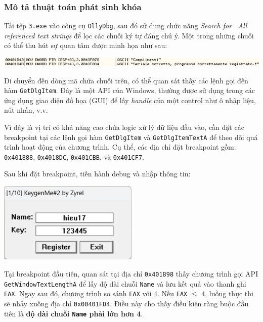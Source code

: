 \subsubsection{Mô tả thuật toán phát sinh khóa}

Tải tệp \texttt{3.exe} vào công cụ \texttt{OllyDbg}, sau đó sử dụng chức năng \textit{Search for \textrightarrow\ All referenced text strings} để lọc các chuỗi ký tự đáng chú ý. Một trong những chuỗi có thể thu hút sự quan tâm được minh họa như sau:

\begin{center}
    \includegraphics[width=\textwidth]{img/file-3/1.png}
\end{center}

Di chuyển đến dòng mã chứa chuỗi trên, có thể quan sát thấy các lệnh gọi đến hàm \texttt{GetDlgItem}. Đây là một API của Windows, thường được sử dụng trong các ứng dụng giao diện đồ họa (GUI) để lấy \textit{handle} của một control như ô nhập liệu, nút nhấn, v.v.

Vì đây là vị trí có khả năng cao chứa logic xử lý dữ liệu đầu vào, cần đặt các breakpoint tại các lệnh gọi hàm \texttt{GetDlgItem} và \texttt{GetDlgItemTextA} để theo dõi quá trình hoạt động của chương trình. Cụ thể, các địa chỉ đặt breakpoint gồm: \texttt{0x401888}, \texttt{0x4018DC}, \texttt{0x401CBB}, và \texttt{0x401CF7}.

\vspace{0.5em}
Sau khi đặt breakpoint, tiến hành debug và nhập thông tin:

\begin{center}
    \includegraphics[width=0.5\textwidth]{img/file-3/2.png}
\end{center}

Tại breakpoint đầu tiên, quan sát tại địa chỉ \texttt{0x401898} thấy chương trình gọi API \texttt{GetWindowTextLengthA} để lấy độ dài chuỗi \texttt{Name} và lưu kết quả vào thanh ghi \texttt{EAX}. Ngay sau đó, chương trình so sánh \texttt{EAX} với 4. Nếu \texttt{EAX} $\leq$ 4, luồng thực thi sẽ nhảy xuống địa chỉ \texttt{0x00401FD4}. Điều này cho thấy điều kiện ràng buộc đầu tiên là \textbf{độ dài chuỗi \texttt{Name} phải lớn hơn 4}.


